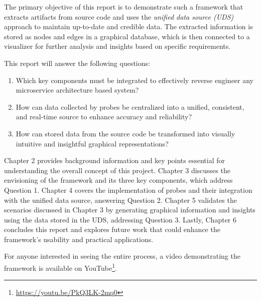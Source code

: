 The primary objective of this report is to demonstrate such a framework that extracts artifacts from source code and uses the \textit{unified data source (UDS)} approach to maintain up-to-date and credible data. The extracted information is stored as nodes and edges in a graphical database, which is then connected to a visualizer for further analysis and insights based on specific requirements.

This report will answer the following questions:
\begin{enumerate}
    \item Which key components must be integrated to effectively reverse engineer any microservice architecture based system?
    \item How can data collected by probes be centralized into a unified, consistent, and real-time source to enhance accuracy and reliability?
    \item How can stored data from the source code be transformed into visually intuitive and insightful graphical representations?
\end{enumerate}

Chapter 2 provides background information and key points essential for understanding the overall concept of this project. Chapter 3 discusses the envisioning of the framework and its three key components, which address Question 1. Chapter 4 covers the implementation of probes and their integration with the unified data source, answering Question 2. Chapter 5 validates the scenarios discussed in Chapter 3 by generating graphical information and insights using the data stored in the UDS, addressing Question 3. Lastly, Chapter 6 concludes this report and explores future work that could enhance the framework's usability and practical applications.

For anyone interested in seeing the entire process, a video demonstrating the framework is available on YouTube\footnote{\url{https://youtu.be/PkQ3LK-2mq0}}.